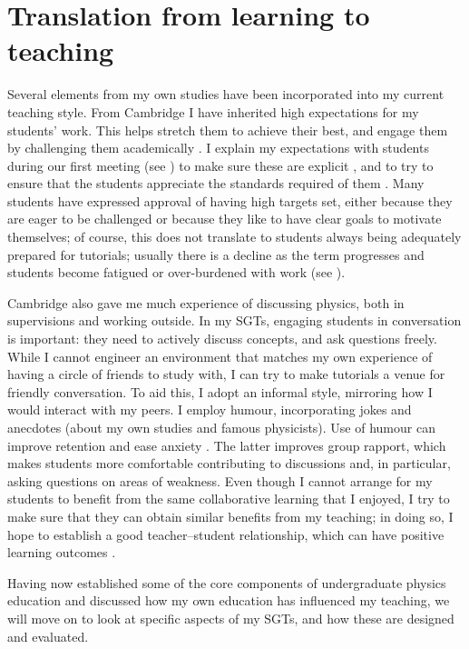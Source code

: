 \section{Translation from learning to teaching}

Several elements from my own studies have been incorporated into my current teaching style. From Cambridge I have inherited high expectations for my students' work. This helps stretch them to achieve their best, and engage them by challenging them academically \citep{Bamber2015}. I explain my expectations with students during our first meeting (see ) to make sure these are explicit \citep{Butcher2015}, and to try to ensure that the students appreciate the standards required of them \citep[chapter 8]{Ramsden1992}. Many students have expressed approval of having high targets set, either because they are eager to be challenged or because they like to have clear goals to motivate themselves; of course, this does not translate to students always being adequately prepared for tutorials; usually there is a decline as the term progresses and students become fatigued or over-burdened with work (see ).

Cambridge also gave me much experience of discussing physics, both in supervisions and working outside. In my SGTs, engaging students in conversation is important: they need to actively discuss concepts, and ask questions freely. While I cannot engineer an environment that matches my own experience of having a circle of friends to study with, I can try to make tutorials a venue for friendly conversation. To aid this, I adopt an informal style, mirroring how I would interact with my peers. I employ humour, incorporating jokes and anecdotes (about my own studies and famous physicists). Use of humour can improve retention and ease anxiety \citep[e.g.,][and references therein]{Korobkin1988,Lesser2008}. The latter improves group rapport, which makes students more comfortable contributing to discussions and, in particular, asking questions on areas of weakness. Even though I cannot arrange for my students to benefit from the same collaborative learning that I enjoyed, I try to make sure that they can obtain similar benefits from my teaching; in doing so, I hope to establish a good teacher--student relationship, which can have positive learning outcomes \citep{Cornelius-White2007}.

Having now established some of the core components of undergraduate physics education and discussed how my own education has influenced my teaching, we will move on to look at specific aspects of my SGTs, and how these are designed and evaluated.
